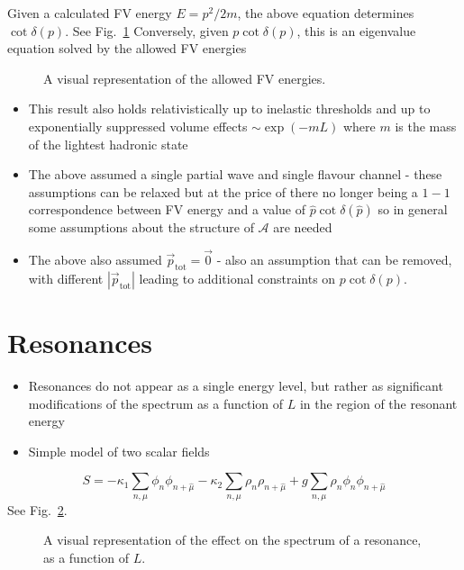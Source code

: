Given a calculated FV energy $E = p^2/2m$, the above equation determines $\cot \delta(p)$. See Fig.~\ref{fig:Sfunc}
%
Conversely, given $p \cot \delta(p)$, this is an eigenvalue equation solved by the allowed FV energies
\begin{figure}
\caption{A visual representation of the allowed FV energies.
\label{fig:Sfunc}}
\end{figure}
\begin{itemize}
    \item This result also holds relativistically up to inelastic thresholds and up to exponentially suppressed volume effects $\sim \exp(-m L)$ where $m$ is the mass of the lightest hadronic state
    \item The above assumed a single partial wave and single flavour channel - these assumptions can be relaxed but at the price of there no longer being a $1-1$ correspondence between FV energy and a value of $\hat{p}\cot \delta(\hat{p})$ so in general some assumptions about the structure of $\mathcal{A}$ are needed
    \item The above also assumed $\vec{p}_{\text{tot}} = \vec{0}$ - also an assumption that can be removed, with different $|\vec{p}_{\text{tot}}|$ leading to additional constraints on $p \cot \delta(p)$.
\end{itemize}
\section{Resonances}
\begin{itemize}
    \item Resonances do not appear as a single energy level, but rather as significant modifications of the spectrum as a function of $L$ in the region of the resonant energy
    \item Simple model of two scalar fields
\end{itemize}

\begin{equation}
    S = -\kappa_1 \sum_{n,\mu}\phi_n \phi_{n + \hat{\mu}} - \kappa_2 \sum_{n, \mu} \rho_n \rho_{n + \hat{\mu}}  + g \sum_{n, \mu}\rho_n \phi_n \phi_{n + \hat{\mu}}
\end{equation}
See Fig.~\ref{fig:resonance}.
\begin{figure}
\begin{subfigure}{0.4\textwidth}
\end{subfigure}
\begin{subfigure}{0.4\textwidth}
\end{subfigure}
\caption{A visual representation of the effect on the spectrum of a resonance, as a function of $L$.
\label{fig:resonance}}
\end{figure}
